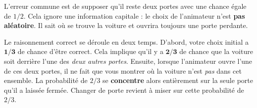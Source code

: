 \begin{intuitionbox}
L'erreur commune est de supposer qu'il reste deux portes avec une chance égale de $1/2$. Cela ignore une information capitale : le choix de l'animateur n'est \textbf{pas aléatoire}. Il sait où se trouve la voiture et ouvrira toujours une porte perdante.

Le raisonnement correct se déroule en deux temps. D'abord, votre choix initial a $\mathbf{1/3}$ de chance d'être correct. Cela implique qu'il y a $\mathbf{2/3}$ de chance que la voiture soit derrière l'une des \textit{deux autres portes}. Ensuite, lorsque l'animateur ouvre l'une de ces deux portes, il ne fait que vous montrer où la voiture n'est \textit{pas} dans cet ensemble. La probabilité de $2/3$ se \textbf{concentre} alors entièrement sur la seule porte qu'il a laissée fermée. Changer de porte revient à miser sur cette probabilité de $2/3$.
\end{intuitionbox}

